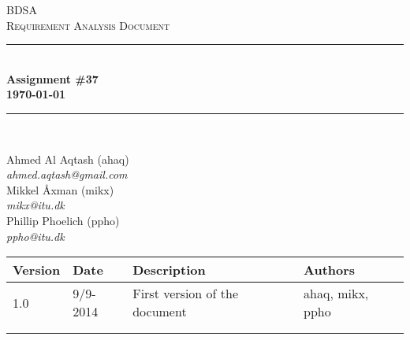 \documentclass[10pt]{report}
\numberwithin{equation}{section} %
\numberwithin{figure}{section} %
\numberwithin{table}{section} %
\newcommand{\HRule}{\rule{\linewidth}{0.5mm}}
\begin{document}
\begin{titlepage}

\begin{center}

\textsc{\LARGE BDSA}\\[1.5cm]

\textsc{\Large Requirement Analysis Document}\\[0.5cm]

\HRule \\[0.4cm]

{ \bfseries Assignment \#37 \\[0.5cm] 
    {\small \today}} \\[0.7cm]

\HRule \\ [6.5cm]

\begin{minipage}{0.5\textwidth}
\begin{flushleft} \large
Ahmed Al Aqtash (ahaq)\\
\textit{ahmed.aqtash@gmail.com}\\
Mikkel Åxman (mikx)\\
\textit{mikx@itu.dk}\\
Phillip Phoelich (ppho)\\
\textit{ppho@itu.dk}\\

\vfill 
\end{flushleft}
\end{minipage}

\end{center}

\end{titlepage}
\clearpage
\begin{table}[h]
\begin{tabularx}{\textwidth}{l l X l}
\textbf{Version} & \textbf{Date} & \textbf{Description} & \textbf{Authors} \\ \midrule
1.0     & 9/9-2014 & First version of the document & ahaq, mikx, ppho  \\
        &          &                               & \\
        &          &                               & \\
\end{tabularx}
\end{table}

\clearpage
\end{document}
